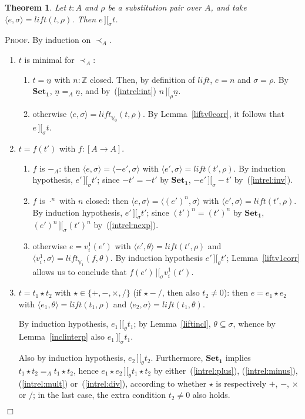 \documentclass{article}
\newtheorem{theorem}[definition]{Theorem}
\newenvironment{proof}{\smallskip\textsc{Proof.}}{\hspace*{\fill}$\Box$}
\newcommand{\intII}{\,]\![}
\newcommand{\intrel}{\mathbin{\intII_{\rho}}}
\newcommand{\Z}{{\mathbb Z}}
\newcommand{\V}{{\mathbb V}}
\newcommand{\less}{\mathrel{\prec_A}}
\newcommand{\axiom}[1]{\ensuremath{\mathbf{#1}}}
\newcommand{\liftv}[1]{\ensuremath{\mathit{lift}_{\V_{#1}}}}
\newcommand{\lift}{\ensuremath{\mathit{lift}}}
\newcommand{\intrels}{\mathbin{\intII_{\sigma}}}
\newcommand{\intrelt}{\mathbin{\intII_{\theta}}}
\begin{document}
\begin{theorem}\label{liftcorrect}
Let $t:A$ and $\rho$ be a substitution pair over $A$, and take
$\langle e,\sigma\rangle=\lift(t,\rho)$.  Then $e\intrels t$.
\end{theorem}
\begin{proof} By induction on $\less$.
\begin{enumerate}
\item $t$ is minimal for $\less$:
\begin{enumerate}
\item $t=\underline n$ with $n:\Z$ closed.  Then, by definition of
\lift, $e=n$ and $\sigma=\rho$.  By \axiom{Set_1}, $\underline
n=_A\underline n$, and by~(\ref{intrel:int}) $n\intrel\underline n$.
\item otherwise $\langle e,\sigma\rangle=\liftv0(t,\rho)$.  By
Lemma~\ref{liftv0corr}, it follows that $e\intrels t$.
\end{enumerate}
\item $t=f(t')$ with $f:[A\to A]$.
\begin{enumerate}
\item $f$ is $-_A$: then
$\langle e,\sigma\rangle=\langle -e',\sigma\rangle$ with
$\langle e',\sigma\rangle=\lift(t',\rho)$.  By induction hypothesis,
$e'\intrels t'$; since $-t'=-t'$ by \axiom{Set_1}, $-e'\intrels -t'$
by~(\ref{intrel:inv}).
\item $f$ is $\cdot^n$ with $n$ closed: then
$\langle e,\sigma\rangle=\langle (e')^n,\sigma\rangle$ with
$\langle e',\sigma\rangle=\lift(t',\rho)$.  By induction hypothesis,
$e'\intrels t'$; since $(t')^n=(t')^n$ by \axiom{Set_1},
$(e')^n\intrels(t')^n$ by~(\ref{intrel:nexp}).
\item otherwise $e=v^1_i(e')$ with
$\langle e',\theta\rangle=\lift(t',\rho)$ and
$\langle v^1_i,\sigma\rangle=\liftv1(f,\theta)$.  By induction
hypothesis $e'\intrelt t'$; Lemma~\ref{liftv1corr} allows us to
conclude that $f(e')\intrels v^1_i(t')$.
\end{enumerate}
\item $t=t_1\star t_2$ with $\star\in\{+,-,\times,/\}$ (if $\star-/$, then
also $t_2\neq 0$): then $e=e_1\star e_2$ with
$\langle e_1,\theta\rangle=\lift(t_1,\rho)$ and
$\langle e_2,\sigma\rangle=\lift(t_1,\theta)$.

By induction hypothesis, $e_1\intrelt t_1$; by Lemma~\ref{liftincl},
$\theta\subseteq\sigma$, whence by Lemma~\ref{inclinterp} also
$e_1\intrels t_1$.

Also by induction hypothesis, $e_2\intrelt t_2$.  Furthermore,
\axiom{Set_1} implies $t_1\star t_2=_A t_1\star t_2$, hence $e_1\star
e_2\intrelt t_1\star t_2$ by either~(\ref{intrel:plus}),
(\ref{intrel:minus}), (\ref{intrel:mult}) or~(\ref{intrel:div}),
according to whether $\star$ is respectively $+$, $-$, $\times$ or
$/$; in the last case, the extra condition $t_2\neq 0$ also holds.
\end{enumerate}
\end{proof}
\end{document}
